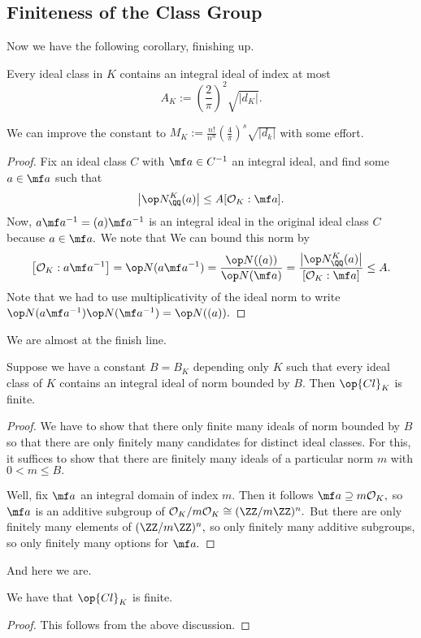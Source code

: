 \documentclass[../notes.tex]{subfiles}
\begin{document}
\subsection{Finiteness of the Class Group}
Now we have the following corollary, finishing up.
\begin{corollary}
    Every ideal class in $K$ contains an integral ideal of index at most
    \[A_K:=\left(\frac2\pi\right)^2\sqrt{|d_K|}.\]
\end{corollary}
\begin{remark}
    We can improve the constant to $M_K:=\frac{n!}{n^n}\left(\frac4\pi\right)^s\sqrt{|d_k|}$ with some effort.
\end{remark}
\begin{proof}
    Fix an ideal class $C$ with $\mf a\in C^{-1}$ an integral ideal, and find some $a\in\mf a$ such that
    \[\left|\op N_\QQ^K(a)\right|\le A[\mathcal O_K:\mf a].\]
    Now, $a\mf a^{-1}=(a)\mf a^{-1}$ is an integral ideal in the original ideal class $C$ because $a\in\mf a.$ We note that We can bound this norm by
    \[\left[\mathcal O_K:a\mf a^{-1}\right]=\op N(a\mf a^{-1})=\frac{\op N((a))}{\op N(\mf a)}=\frac{\left|\op N_\QQ^K(a)\right|}{[\mathcal O_K:\mf a]}\le A.\]
    Note that we had to use multiplicativity of the ideal norm to write $\op N(a\mf a^{-1})\op N(\mf a^{-1})=\op N((a)).$
\end{proof}
We are almost at the finish line.
\begin{lemma}
    Suppose we have a constant $B=B_K$ depending only $K$ such that every ideal class of $K$ contains an integral ideal of norm bounded by $B.$ Then $\op{Cl}_K$ is finite.
\end{lemma}
\begin{proof}
    We have to show that there only finite many ideals of norm bounded by $B$ so that there are only finitely many candidates for distinct ideal classes. For this, it suffices to show that there are finitely many ideals of a particular norm $m$ with $0<m\le B.$

    Well, fix $\mf a$ an integral domain of index $m.$ Then it follows $\mf a\supseteq m\mathcal O_K,$ so $\mf a$ is an additive subgroup of $\mathcal O_K/m\mathcal O_K\cong(\ZZ/m\ZZ)^n.$ But there are only finitely many elements of $(\ZZ/m\ZZ)^n,$ so only finitely many additive subgroups, so only finitely many options for $\mf a.$
\end{proof}
And here we are.
\begin{theorem}
    We have that $\op{Cl}_K$ is finite.
\end{theorem}
\begin{proof}
    This follows from the above discussion.
\end{proof}
\end{document}

